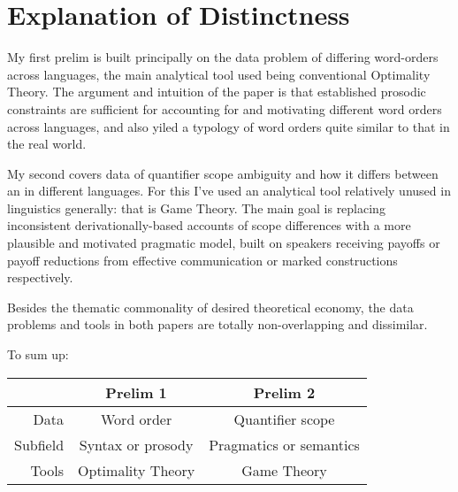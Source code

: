 \documentclass{article}
\begin{document}
\section{Explanation of Distinctness}

My first prelim is built principally on the data problem of differing word-orders across languages, the main analytical tool used being conventional Optimality Theory. The argument and intuition of the paper is that established prosodic constraints are sufficient for accounting for and motivating different word orders across languages, and also yiled a typology of word orders quite similar to that in the real world.

My second covers data of quantifier scope ambiguity and how it differs between an in different languages. For this I've used an analytical tool relatively unused in linguistics generally: that is Game Theory. The main goal is replacing inconsistent derivationally-based accounts of scope differences with a more plausible and motivated pragmatic model, built on speakers receiving payoffs or payoff reductions from effective communication or marked constructions respectively.

Besides the thematic commonality of desired theoretical economy, the data problems and tools in both papers are totally non-overlapping and dissimilar.

To sum up:

\begin{tabular}{r||cc}
	&Prelim 1&Prelim 2\\\hline\hline
	Data&Word order&Quantifier scope\\
	Subfield&Syntax or prosody&Pragmatics or semantics\\
	Tools&Optimality Theory&Game Theory\\
\end{tabular}
\end{document}

